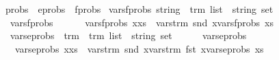 \begin{isabellebody}
\ probs\ {\isacharequal}{\kern0pt}\ {\isachardoublequoteopen}eprobs\ {\isasymtimes}\ fprobs{\isachardoublequoteclose}\isanewline
\isanewline
\isanewline
{}\isamarkupfalse%
\ vars{\isacharunderscore}{\kern0pt}fprobs{\isacharcolon}{\kern0pt}{\isacharcolon}{\kern0pt}\ {\isachardoublequoteopen}{\isacharparenleft}{\kern0pt}{\isacharparenleft}{\kern0pt}string\ {\isasymtimes}\ trm{\isacharparenright}{\kern0pt}\ list{\isacharparenright}{\kern0pt}\ {\isasymRightarrow}\ {\isacharparenleft}{\kern0pt}string\ set{\isacharparenright}{\kern0pt}{\isachardoublequoteclose}\isanewline
\ \ \isanewline
\ \ {\isachardoublequoteopen}vars{\isacharunderscore}{\kern0pt}fprobs\ {\isacharbrackleft}{\kern0pt}{\isacharbrackright}{\kern0pt}\ {\isacharequal}{\kern0pt}\ {\isacharbraceleft}{\kern0pt}{\isacharbraceright}{\kern0pt}{\isachardoublequoteclose}\ {\isacharbar}{\kern0pt}\isanewline
\ \ {\isachardoublequoteopen}vars{\isacharunderscore}{\kern0pt}fprobs\ {\isacharparenleft}{\kern0pt}x{\isacharhash}{\kern0pt}xs{\isacharparenright}{\kern0pt}\ {\isacharequal}{\kern0pt}\ {\isacharparenleft}{\kern0pt}vars{\isacharunderscore}{\kern0pt}trm\ {\isacharparenleft}{\kern0pt}snd\ x{\isacharparenright}{\kern0pt}{\isacharparenright}{\kern0pt}{\isasymunion}{\isacharparenleft}{\kern0pt}vars{\isacharunderscore}{\kern0pt}fprobs\ xs{\isacharparenright}{\kern0pt}{\isachardoublequoteclose}\isanewline
\isanewline
{}\isamarkupfalse%
\ \ vars{\isacharunderscore}{\kern0pt}eprobs\ {\isacharcolon}{\kern0pt}{\isacharcolon}{\kern0pt}\ {\isachardoublequoteopen}{\isacharparenleft}{\kern0pt}{\isacharparenleft}{\kern0pt}trm\ {\isasymtimes}\ trm{\isacharparenright}{\kern0pt}\ list{\isacharparenright}{\kern0pt}\ {\isasymRightarrow}\ {\isacharparenleft}{\kern0pt}string\ set{\isacharparenright}{\kern0pt}{\isachardoublequoteclose}\isanewline
\ \ \isanewline
\ \ \ {\isachardoublequoteopen}vars{\isacharunderscore}{\kern0pt}eprobs\ {\isacharbrackleft}{\kern0pt}{\isacharbrackright}{\kern0pt}\ {\isacharequal}{\kern0pt}\ {\isacharbraceleft}{\kern0pt}{\isacharbraceright}{\kern0pt}{\isachardoublequoteclose}\ {\isacharbar}{\kern0pt}\isanewline
\ \ \ {\isachardoublequoteopen}vars{\isacharunderscore}{\kern0pt}eprobs\ {\isacharparenleft}{\kern0pt}x{\isacharhash}{\kern0pt}xs{\isacharparenright}{\kern0pt}\ {\isacharequal}{\kern0pt}\ {\isacharparenleft}{\kern0pt}vars{\isacharunderscore}{\kern0pt}trm\ {\isacharparenleft}{\kern0pt}snd\ x{\isacharparenright}{\kern0pt}{\isacharparenright}{\kern0pt}{\isasymunion}{\isacharparenleft}{\kern0pt}vars{\isacharunderscore}{\kern0pt}trm\ {\isacharparenleft}{\kern0pt}fst\ x{\isacharparenright}{\kern0pt}{\isacharparenright}{\kern0pt}{\isasymunion}{\isacharparenleft}{\kern0pt}vars{\isacharunderscore}{\kern0pt}eprobs\ xs{\isacharparenright}{\kern0pt}{\isachardoublequoteclose}\isanewline

\end{isabellebody}
